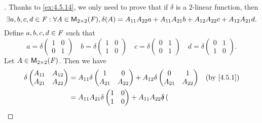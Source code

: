 \begin{proof}[]
	Thanks to \cref{ex:4.5.14}, we only need to prove that if \(\delta\) is a \(2\)-linear function, then
	\[
		\exists a, b, c, d \in \F : \forall A \in \ms[2][2][\F], \delta(A) = A_{1 1} A_{2 2} a + A_{1 1} A_{2 1} b + A_{1 2} A_{2 2} c + A_{1 2} A_{2 1} d.
	\]
	Define \(a, b, c, d \in \mathit{F}\) such that
	\[
		a = \delta\begin{pmatrix}
			1 & 0 \\
			0 & 1
		\end{pmatrix} \quad b = \delta\begin{pmatrix}
			1 & 0 \\
			1 & 0
		\end{pmatrix} \quad c = \delta\begin{pmatrix}
			0 & 1 \\
			0 & 1
		\end{pmatrix} \quad d = \delta\begin{pmatrix}
			0 & 1 \\
			1 & 0
		\end{pmatrix}.
	\]
	Let \(A \in \ms[2][2][\F]\).
	Then we have
	\begin{align*}
		\delta\begin{pmatrix}
			      A_{1 1} & A_{1 2} \\
			      A_{2 1} & A_{2 2}
		      \end{pmatrix} & = A_{1 1} \delta\begin{pmatrix}
			                                      1       & 0       \\
			                                      A_{2 1} & A_{2 2}
		                                      \end{pmatrix} + A_{1 2} \delta\begin{pmatrix}
			                                                                    0       & 1       \\
			                                                                    A_{2 1} & A_{2 2}
		                                                                    \end{pmatrix}                                    &  & \by{4.5.1}                 \\
		                      & = A_{1 1} A_{2 1} \delta\begin{pmatrix}
			                                                1 & 0 \\
			                                                1 & 0
		                                                \end{pmatrix} + A_{1 1} A_{2 2} \delta\begin{pmatrix}

\end{pmatrix}
\end{align*}
\end{proof}
